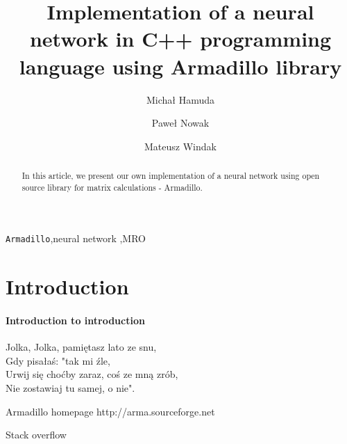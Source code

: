\documentclass[3p,twocolumn]{elsarticle}
\begin{document}
\begin{frontmatter}

\title{Implementation of a neural network in C++ programming language using Armadillo library}

\author{Michał Hamuda}


\author{Paweł Nowak}

\author{Mateusz Windak}



\begin{abstract}
In this article, we present our own implementation of a neural network using open source library for matrix calculations - Armadillo.
\end{abstract}

\begin{keyword}
\texttt{Armadillo}\sep neural network \sep MRO
\end{keyword}

\end{frontmatter}


\section{Introduction}

\paragraph{Introduction to introduction} 
Jolka, Jolka, pamiętasz lato ze snu, \\
Gdy pisałaś: "tak mi źle, \\
Urwij się choćby zaraz, coś ze mną zrób, \\
Nie zostawiaj tu samej, o nie". \\




%

 \begin{thebibliography}{00}

%

  Armadillo homepage http://arma.sourceforge.net
 
  Stack overflow

 \end{thebibliography}
\end{document}
